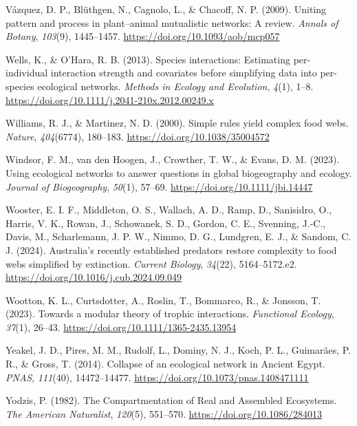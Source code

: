 \documentclass[
]{article}
\newlength{\cslhangindent}
\newenvironment{CSLReferences}[2] %
 {\begin{list}{}{%
  \setlength{\itemindent}{0pt}
  \setlength{\leftmargin}{0pt}
  \setlength{\parsep}{0pt}
  \ifodd #1
   \setlength{\leftmargin}{\cslhangindent}
   \setlength{\itemindent}{-1\cslhangindent}
  \fi
  \setlength{\itemsep}{#2\baselineskip}}}
 {\end{list}}
\begin{document}
\begin{CSLReferences}{1}{0}
Vázquez, D. P., Blüthgen, N., Cagnolo, L., \& Chacoff, N. P. (2009).
Uniting pattern and process in plant--animal mutualistic networks: A
review. \emph{Annals of Botany}, \emph{103}(9), 1445--1457.
\url{https://doi.org/10.1093/aob/mcp057}

Wells, K., \& O'Hara, R. B. (2013). Species interactions: Estimating
per-individual interaction strength and covariates before simplifying
data into per-species ecological networks. \emph{Methods in Ecology and
Evolution}, \emph{4}(1), 1--8.
\url{https://doi.org/10.1111/j.2041-210x.2012.00249.x}

Williams, R. J., \& Martinez, N. D. (2000). Simple rules yield complex
food webs. \emph{Nature}, \emph{404}(6774), 180--183.
\url{https://doi.org/10.1038/35004572}

Windsor, F. M., van den Hoogen, J., Crowther, T. W., \& Evans, D. M.
(2023). Using ecological networks to answer questions in global
biogeography and ecology. \emph{Journal of Biogeography}, \emph{50}(1),
57--69. \url{https://doi.org/10.1111/jbi.14447}

Wooster, E. I. F., Middleton, O. S., Wallach, A. D., Ramp, D.,
Sanisidro, O., Harris, V. K., Rowan, J., Schowanek, S. D., Gordon, C.
E., Svenning, J.-C., Davis, M., Scharlemann, J. P. W., Nimmo, D. G.,
Lundgren, E. J., \& Sandom, C. J. (2024). Australia's recently
established predators restore complexity to food webs simplified by
extinction. \emph{Current Biology}, \emph{34}(22), 5164--5172.e2.
\url{https://doi.org/10.1016/j.cub.2024.09.049}

Wootton, K. L., Curtsdotter, A., Roslin, T., Bommarco, R., \& Jonsson,
T. (2023). Towards a modular theory of trophic interactions.
\emph{Functional Ecology}, \emph{37}(1), 26--43.
\url{https://doi.org/10.1111/1365-2435.13954}

Yeakel, J. D., Pires, M. M., Rudolf, L., Dominy, N. J., Koch, P. L.,
Guimarães, P. R., \& Gross, T. (2014). Collapse of an ecological network
in {Ancient Egypt}. \emph{PNAS}, \emph{111}(40), 14472--14477.
\url{https://doi.org/10.1073/pnas.1408471111}

Yodzis, P. (1982). The {Compartmentation} of {Real} and {Assembled
Ecosystems}. \emph{The American Naturalist}, \emph{120}(5), 551--570.
\url{https://doi.org/10.1086/284013}

\end{CSLReferences}
\end{document}
